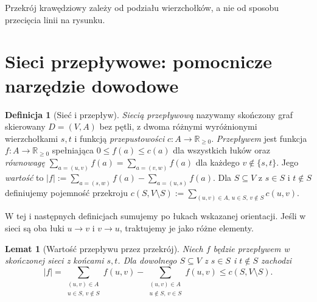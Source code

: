 \documentclass[11pt,a4paper]{report}
\numberwithin{equation}{section}
\theoremstyle{plain}
\newtheorem{lemat}[twierdzenie]{Lemat}
\theoremstyle{definition}
\newtheorem{definicja}[twierdzenie]{Definicja}
\theoremstyle{remark}
\begin{document}
\begin{center}

{\footnotesize Przekrój krawędziowy zależy od podziału wierzchołków,
a nie od sposobu przecięcia linii na rysunku.}
\end{center}

\section{Sieci przepływowe: pomocnicze narzędzie dowodowe}
\label{sec:tg-flows}

\begin{definicja}[Sieć i przepływ]
\emph{Siecią przepływową} nazywamy skończony graf skierowany
$D=(V,A)$ bez pętli, z dwoma różnymi wyróżnionymi wierzchołkami
$s,t$ i funkcją \emph{przepustowości}
$c:A\to\mathbb R_{\ge0}$.
\emph{Przepływem} jest funkcja $f:A\to\mathbb R_{\ge0}$
spełniająca $0\le f(a)\le c(a)$ dla wszystkich łuków oraz
\emph{równowagę} $\sum_{a=(u,v)}f(a)=\sum_{a=(v,w)}f(a)$
dla każdego $v\notin\{s,t\}$. Jego \emph{wartość} to
$|f|:=\sum_{a=(s,w)}f(a)-\sum_{a=(u,s)}f(a)$.
Dla $S\subseteq V$ z $s\in S$ i $t\notin S$ definiujemy
pojemność przekroju
$c(S,V\setminus S):=\sum_{(u,v)\in A,\,u\in S,\,v\notin S}c(u,v)$.
\end{definicja}

W tej i następnych definicjach sumujemy po łukach
wskazanej orientacji. Jeśli w sieci są oba łuki $u\to v$
i $v\to u$, traktujemy je jako różne elementy.

\begin{lemat}[Wartość przepływu przez przekrój]
\label{lem:tg-cutbound}
Niech $f$ będzie przepływem w skończonej sieci z końcami
$s,t$. Dla dowolnego $S\subseteq V$ z $s\in S$ i $t\notin S$
zachodzi
\[
|f|=\sum_{\substack{(u,v)\in A\\u\in S,\,v\notin S}}f(u,v)
 -\sum_{\substack{(u,v)\in A\\u\notin S,\,v\in S}}f(u,v)
 \le c(S,V\setminus S).
\]
\end{lemat}
\end{document}
